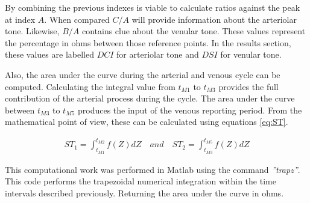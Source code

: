 By combining the previous indexes is viable to calculate ratios against the peak at index $A$. When compared $C/A$ will provide information about the arteriolar tone. Likewise, $B/A$ contains clue about the venular tone. These values represent the percentage in ohms between those reference points. In the results section, these values are labelled $DCI$ for arteriolar tone and $DSI$ for venular tone.


Also, the area under the curve during the arterial and venous cycle can be computed. Calculating the integral value from $t_{M1}$ to $t_{M3}$ provides the full contribution of the arterial process during the cycle. The area under the curve between $t_{M3}$ to $t_{M5}$ produces the input of the venous reporting period. From the mathematical point of view, these can be calculated using equations \ref{eq:ST}.

\begin{align}
	\label{eq:ST}
	ST_1 = \int_{t_{M1}}^{t_{M2}} f(Z) dZ \quad and \quad ST_2 = \int_{t_{M3}}^{t_{M5}} f(Z) dZ 
\end{align}

This computational work was performed in Matlab using the command \textit{''trapz''}. This code performs the trapezoidal numerical integration within the time intervals described previously. Returning the area under the curve in ohms.



\nomenclature[g-p]{$\pi$}{ $\simeq 3.14\ldots$}  

